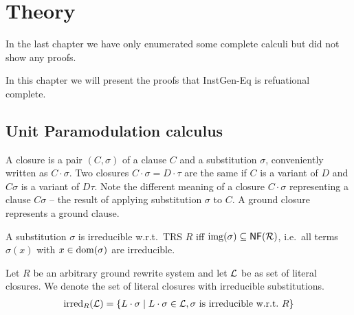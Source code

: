 
\chapter{Theory}

In the last chapter we have only enumerated some complete calculi but did not show any proofs.

In this chapter we will present the proofs that InstGen-Eq is refuational complete.


\section{Unit Paramodulation calculus}

\cite{GK2004csl, NR2001}


\begin{definition}
    A closure is a pair $(C,\sigma)$ of a clause $C$ and a substitution $\sigma$,
    conveniently written as $C\cdot\sigma$. Two closures $C\cdot\sigma = D\cdot\tau$
    are the same if $C$ is a variant of $D$ and $C\sigma$ is a variant of $D\tau$.
    Note the different meaning of a closure $C\cdot\sigma$ representing a clause $C\sigma$
    -- the result of applying substitution $\sigma$ to $C$.
    A ground closure represents a ground clause.
\end{definition}

\begin{definition}
    A substitution $\sigma$ is irreducible w.r.t.~TRS $R$
    iff
    $\operatorname{img}(\sigma)\subseteq\mathsf{NF}({\mathcal R})$,
    i.e.~all terms $\sigma(x)$ with $x\in\operatorname{dom}(\sigma)$ are irreducible.
\end{definition}

\begin{definition}
    Let $R$ be an arbitrary ground rewrite system and
    let ${\mathcal L}$ be as set of literal closures.
    We denote the set of literal closures with irreducible substitutions.
    \begin{gather*}
        \operatorname{irred}_R({\mathcal L})
        =
        \{
            L\cdot\sigma \mid
            L\cdot\sigma\in{\mathcal L},
            \sigma\text{ is irreducible w.r.t.~}R
        \}
    \end{gather*}
\end{definition}


